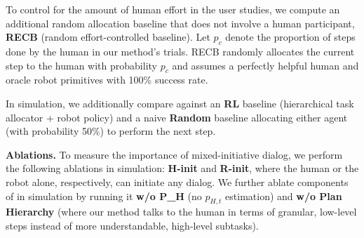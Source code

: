 To control for the amount of human effort in the user studies, we compute an additional random allocation baseline that does not involve a human participant, \textbf{RECB} (random effort-controlled baseline). Let $p_c$ denote the proportion of steps done by the human in our method's trials. RECB randomly allocates the current step to the human with probability $p_{c}$ and assumes a perfectly helpful human and oracle robot primitives with 100\% success rate.

In simulation, we additionally compare against an \textbf{RL} baseline (hierarchical task allocator + robot policy)
and a naive \textbf{Random} baseline allocating either agent (with probability 50\%) to perform the next step.


\textbf{Ablations.} To measure the importance of mixed-initiative dialog, we perform the following ablations in simulation: \textbf{H-init} and \textbf{R-init}, where the human or the robot alone, respectively, can initiate any dialog. We further ablate components of \ours{} in simulation by running it \textbf{w/o P\_H} (no $p_{H, t}$ estimation) and \textbf{w/o Plan Hierarchy} (where our method talks to the human in terms of granular, low-level steps instead of more understandable, high-level subtasks).


